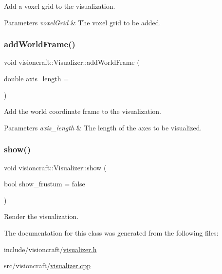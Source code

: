 Add a voxel grid to the visualization. 


\begin{DoxyParams}{Parameters}
{\em voxel\+Grid} & The voxel grid to be added. \\
\hline
\end{DoxyParams}
\mbox{\label{classvisioncraft_1_1Visualizer_adfda4bb9218cd572652b6ff3706add2b}} 
\subsubsection{\texorpdfstring{add\+World\+Frame()}{addWorldFrame()}}
{\footnotesize\ttfamily void visioncraft\+::\+Visualizer\+::add\+World\+Frame (\begin{DoxyParamCaption}\item[{double}]{axis\+\_\+length = {} }\end{DoxyParamCaption})}



Add the world coordinate frame to the visualization. 


\begin{DoxyParams}{Parameters}
{\em axis\+\_\+length} & The length of the axes to be visualized. \\
\hline
\end{DoxyParams}
\mbox{\label{classvisioncraft_1_1Visualizer_a2b6d296697a212964b2883aefbf76c49}} 
\subsubsection{\texorpdfstring{show()}{show()}}
{\footnotesize\ttfamily void visioncraft\+::\+Visualizer\+::show (\begin{DoxyParamCaption}\item[{bool}]{show\+\_\+frustum = {\ttfamily false} }\end{DoxyParamCaption})}



Render the visualization. 



The documentation for this class was generated from the following files\+:\begin{DoxyCompactItemize}
\item 
include/visioncraft/\hyperlink{visualizer_8h}{visualizer.\+h}\item 
src/visioncraft/\hyperlink{visualizer_8cpp}{visualizer.\+cpp}\end{DoxyCompactItemize}
